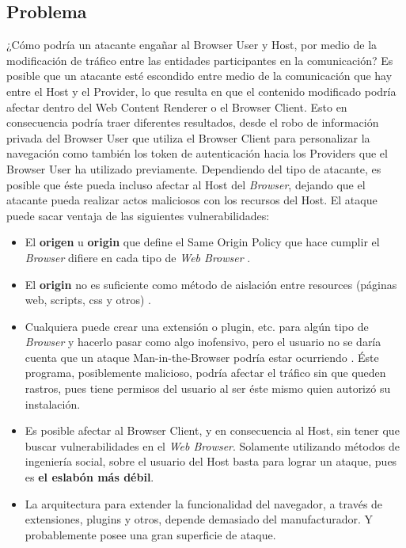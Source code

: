 \subsection{Problema}
¿Cómo podría un atacante engañar al Browser User y Host, por medio de la modificación de tráfico entre las entidades participantes en la comunicación? Es posible que un atacante esté escondido entre medio de la comunicación que hay entre el Host y el Provider, lo que resulta en que el contenido modificado podría afectar dentro del Web Content Renderer o el Browser Client. Esto en consecuencia podría traer diferentes resultados, desde el robo de información privada del Browser User que utiliza el Browser Client para personalizar la navegación como también los token de autenticación hacia los Providers que el Browser User ha utilizado previamente. Dependiendo del tipo de atacante, es posible que éste pueda incluso afectar al Host del \textit{Browser}, dejando que el atacante pueda realizar actos maliciosos con los recursos del Host. 
El ataque puede sacar ventaja de las siguientes vulnerabilidades:
\begin{itemize}
	\item El \textbf{origen} u \textbf{origin} que define el Same Origin Policy que hace cumplir el \textit{Browser} difiere en cada tipo de \textit{Web Browser} \cite{W3C-SOP,Reis2009, Jackson2008, Crowley2010, Paola2006}.
	\item El \textbf{origin} no es suficiente como método de aislación entre resources (páginas web, scripts, css y otros) \cite{Silic2010, Barth2009, Yason, Liu2012}.
	\item Cualquiera puede crear una extensión o plugin, etc. para algún tipo de \textit{Browser} y hacerlo pasar como algo inofensivo, pero el usuario no se daría cuenta que un ataque Man-in-the-Browser podría estar ocurriendo \cite{Dougan2012,Utakrit2009,Liu2012,Barth2010}.  Éste programa, posiblemente malicioso, podría afectar el tráfico sin que queden rastros, pues tiene permisos del usuario al ser éste mismo quien autorizó su instalación.
	\item Es posible afectar al Browser Client, y en consecuencia al Host, sin tener que buscar vulnerabilidades en el \textit{Web Browser}. Solamente utilizando métodos de ingeniería social, sobre el usuario del Host basta para lograr un ataque, pues es \textbf{el eslabón más débil}.
	\item La arquitectura para extender la funcionalidad del navegador, a través de extensiones, plugins y otros, depende demasiado del manufacturador. Y probablemente posee una gran superficie de ataque.
\end{itemize}

